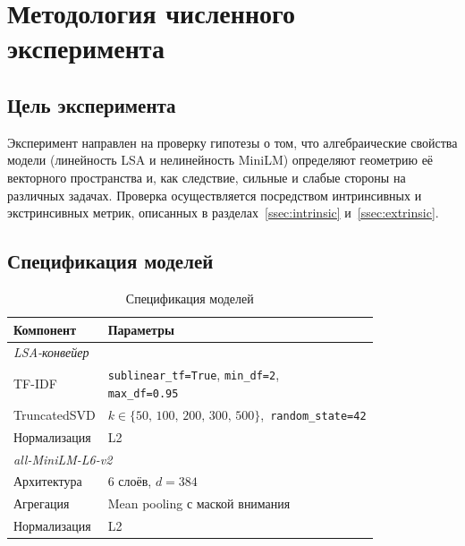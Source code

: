 \section{Методология численного эксперимента}

\subsection{Цель эксперимента}

Эксперимент направлен на проверку гипотезы о том, что алгебраические
свойства модели (линейность LSA и нелинейность MiniLM) определяют
геометрию её векторного пространства и, как следствие, сильные и
слабые стороны на различных задачах.
Проверка осуществляется посредством интринсивных и экстринсивных метрик,
описанных в разделах~\ref{ssec:intrinsic} и~\ref{ssec:extrinsic}.

\subsection{Спецификация моделей}

\begin{table}[H]
  \centering
  \label{tab:models}
  \begin{tabularx}{\linewidth}{lX}
    \toprule
    \textbf{Компонент} & \textbf{Параметры} \\
    \midrule
    \multicolumn{2}{l}{\textit{LSA-конвейер}} \\
    \quad TF-IDF       &
    \makecell[tl]{\texttt{sublinear\_tf=True}, \texttt{min\_df=2},\\
    \texttt{max\_df=0.95}} \\
    \quad TruncatedSVD &
    $k \in \{50,\,100,\,200,\,300,\,500\}$,\ \texttt{random\_state=42} \\
    \quad Нормализация & L2 \\
    \midrule
    \multicolumn{2}{l}{\textit{all-MiniLM-L6-v2}} \\
    \quad Архитектура  & 6 слоёв, $d = 384$ \\
    \quad Агрегация    & Mean pooling с маской внимания \\
    \quad Нормализация & L2 \\
    \bottomrule
  \end{tabularx}
  \caption{Спецификация моделей}
\end{table}

